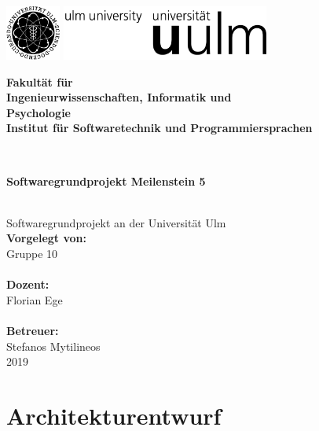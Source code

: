 \documentclass[a4paper,12pt,
headsepline,           %
oneside,               %
pointlessnumbers,      %
bibtotoc,              %
]{scrartcl}
\newcommand{\fullname}{Gruppe 10}
\newcommand{\titel}{Softwaregrundprojekt Meilenstein 5}
\newcommand{\jahr}{2019}
\newcommand{\dozent}{Florian Ege}
\newcommand{\betreuer}{Stefanos Mytilineos}
\newcommand{\fakultaet}{Ingenieurwissenschaften, Informatik und\\Psychologie}
\newcommand{\institut}{Institut für Softwaretechnik und Programmiersprachen}
\begin{document}
    \thispagestyle{empty}
    \begin{addmargin*}[4mm]{-10mm}

        \includegraphics[height=1.8cm]{images/unilogo_bild}
        \hfill
        \includegraphics[height=1.8cm]{images/unilogo_wort}\\[1em]

        {\footnotesize
        \hspace*{115mm}\parbox[t]{35mm}{\bfseries Fakultät für\\
        \fakultaet\\
        \mdseries \institut}\\[2cm]

        \parbox{140mm}{\bfseries \LARGE \titel}\\[2.5em]
        {\footnotesize Softwaregrundprojekt an der Universität Ulm}\\[3em]

        {\footnotesize \bfseries Vorgelegt von:}\\
        {\footnotesize \fullname\\}\\ [1em]
        {\footnotesize \bfseries Dozent:}\\
        {\footnotesize \dozent\\}\\[1em]
        {\footnotesize \bfseries Betreuer:}\\
        {\footnotesize \betreuer}\\ [1em]
        {\footnotesize \jahr}
        }
    \end{addmargin*}
    \pagebreak
    \tableofcontents
    \pagebreak

    \part{Architekturentwurf}

	
   
\end{document}
